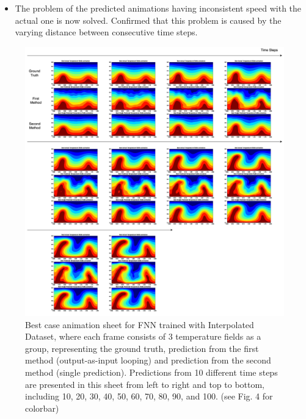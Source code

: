 {\begin{itemize}
\begin{itemize}
            \item The problem of the predicted animations having inconsistent speed with the actual one is now solved. Confirmed that this problem is caused by the varying distance between consecutive time steps.

    \end{itemize}

\end{itemize}

\begin{figure}[H]
    \centering
    \includegraphics[width=0.9\linewidth]{figures/FNN_animation_sheet.png}
    \caption{Best case animation sheet for FNN trained with Interpolated Dataset, where each frame consists of 3 temperature fields as a group, representing the ground truth, prediction from the first method (output-as-input looping) and prediction from the second method (single prediction). Predictions from 10 different time steps are presented in this sheet from left to right and top to bottom, including 10, 20, 30, 40, 50, 60, 70, 80, 90, and 100. (see Fig. 4 for colorbar)}
\end{figure}

}

